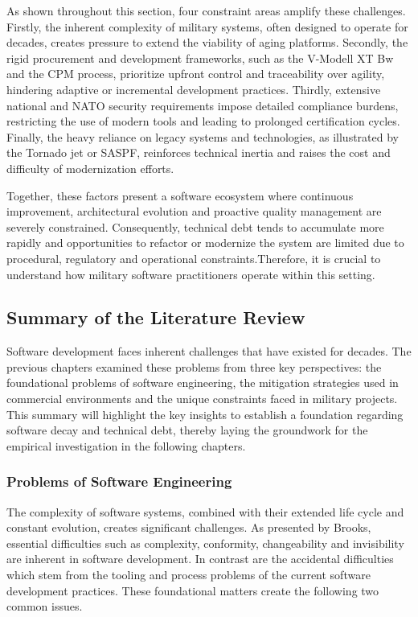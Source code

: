 As shown throughout this section, four constraint areas amplify these challenges. Firstly, the inherent complexity of military systems, often designed to operate for decades, creates pressure to extend the viability of aging platforms.
Secondly, the rigid procurement and development frameworks, such as the V-Modell XT Bw and the \ac{CPM} process, prioritize upfront control and traceability over agility, hindering adaptive or incremental development practices.
Thirdly, extensive national and NATO security requirements impose detailed compliance burdens, restricting the use of modern tools and leading to prolonged certification cycles. Finally, the heavy reliance on legacy systems and technologies, as illustrated by the Tornado jet or SASPF, 
reinforces technical inertia and raises the cost and difficulty of modernization efforts.

Together, these factors present a software ecosystem where continuous improvement, architectural evolution and proactive quality management are severely constrained. Consequently, technical debt tends to accumulate more rapidly and opportunities to refactor or modernize the system are limited due to
procedural, regulatory and operational constraints.Therefore, it is crucial to understand how military software practitioners operate within this setting.

\subsection{Summary of the Literature Review}
Software development faces inherent challenges that have existed for decades. The previous chapters examined these problems from three key perspectives: the foundational problems of software engineering, the mitigation strategies used in commercial environments and the unique constraints faced in military projects.
This summary will highlight the key insights to establish a foundation regarding software decay and technical debt, thereby laying the groundwork for the empirical investigation in the following chapters.

\subsubsection{Problems of Software Engineering}
The complexity of software systems, combined with their extended life cycle and constant evolution, creates significant challenges. As presented by Brooks, essential difficulties such as complexity, conformity, changeability and invisibility are inherent in software development.
In contrast are the accidental difficulties which stem from the tooling and process problems of the current software development practices.
These foundational matters create the following two common issues.

